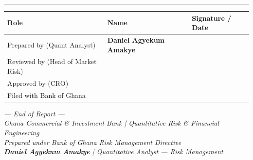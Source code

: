 \documentclass[11pt,a4paper]{article}
\newcommand{\authorname}{Daniel Agyekum Amakye}
\newcommand{\authortitle}{Quantitative Analyst --- Risk Management}
\begin{document}
\vspace{0.8cm}
\noindent\rule{\textwidth}{0.4pt}

\begin{table}[h!]
\centering
\renewcommand{\arraystretch}{1.6}
\begin{tabular}{L{5cm} L{4cm} L{5cm}}
\toprule
\textbf{Role} & \textbf{Name} & \textbf{Signature / Date} \\
\midrule
Prepared by (Quant Analyst)     & \textbf{\authorname} &  \\
Reviewed by (Head of Market Risk) &  &  \\
Approved by (CRO)               &  &  \\
Filed with Bank of Ghana        &  &  \\
\bottomrule
\end{tabular}
\end{table}

\vfill
\begin{center}
\small\itshape
--- End of Report ---\\
Ghana Commercial \& Investment Bank \;|\; Quantitative Risk \& Financial Engineering\\
Prepared under Bank of Ghana Risk Management Directive\\[0.3cm]
\textbf{\authorname} \;|\; \authortitle
\end{center}
\end{document}
